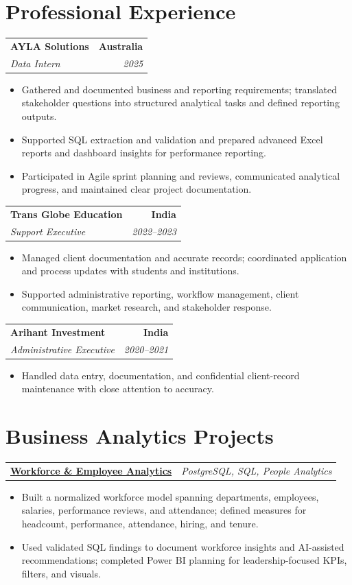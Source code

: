 \documentclass[letterpaper,10pt]{article}
\makeatletter
\newcommand{\role}[4]{%
  \begin{tabularx}{\textwidth}{@{}Xr@{}}
    \textbf{#1} & \textbf{#2} \\
    \textit{#3} & \textit{#4}
  \end{tabularx}\vspace{-1pt}
}
\newcommand{\project}[2]{%
  \begin{tabularx}{\textwidth}{@{}Xr@{}}
    \textbf{#1} & \textit{#2}
  \end{tabularx}\vspace{-1pt}
}
\makeatother
\begin{document}
\section{Professional Experience}
\role{AYLA Solutions}{Australia}{Data Intern}{2025}
\begin{itemize}
  \item Gathered and documented business and reporting requirements; translated stakeholder questions into structured analytical tasks and defined reporting outputs.
  \item Supported SQL extraction and validation and prepared advanced Excel reports and dashboard insights for performance reporting.
  \item Participated in Agile sprint planning and reviews, communicated analytical progress, and maintained clear project documentation.
\end{itemize}
\vspace{1pt}

\role{Trans Globe Education}{India}{Support Executive}{2022--2023}
\begin{itemize}
  \item Managed client documentation and accurate records; coordinated application and process updates with students and institutions.
  \item Supported administrative reporting, workflow management, client communication, market research, and stakeholder response.
\end{itemize}
\vspace{1pt}

\role{Arihant Investment}{India}{Administrative Executive}{2020--2021}
\begin{itemize}
  \item Handled data entry, documentation, and confidential client-record maintenance with close attention to accuracy.
\end{itemize}

\section{Business Analytics Projects}
\project{\href{https://github.com/jainalimehta/HR-Analytics}{Workforce \& Employee Analytics}}{PostgreSQL, SQL, People Analytics}
\begin{itemize}
  \item Built a normalized workforce model spanning departments, employees, salaries, performance reviews, and attendance; defined measures for headcount, performance, attendance, hiring, and tenure.
  \item Used validated SQL findings to document workforce insights and AI-assisted recommendations; completed Power BI planning for leadership-focused KPIs, filters, and visuals.
\end{itemize}
\vspace{1pt}
\end{document}

